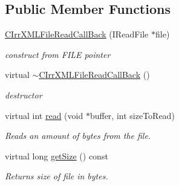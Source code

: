 \subsection*{Public Member Functions}
\begin{DoxyCompactItemize}
\item 
\hypertarget{classirr_1_1io_1_1_c_irr_x_m_l_file_read_call_back_ac7083abde7449c42fef2ebb64e2271d0}{\hyperlink{classirr_1_1io_1_1_c_irr_x_m_l_file_read_call_back_ac7083abde7449c42fef2ebb64e2271d0}{C\-Irr\-X\-M\-L\-File\-Read\-Call\-Back} (I\-Read\-File $\ast$file)}\label{classirr_1_1io_1_1_c_irr_x_m_l_file_read_call_back_ac7083abde7449c42fef2ebb64e2271d0}

\begin{DoxyCompactList}\small\item\em construct from F\-I\-L\-E pointer \end{DoxyCompactList}\item 
\hypertarget{classirr_1_1io_1_1_c_irr_x_m_l_file_read_call_back_a3f792b3c991d2b29fcfc9d48c83b64fb}{virtual \hyperlink{classirr_1_1io_1_1_c_irr_x_m_l_file_read_call_back_a3f792b3c991d2b29fcfc9d48c83b64fb}{$\sim$\-C\-Irr\-X\-M\-L\-File\-Read\-Call\-Back} ()}\label{classirr_1_1io_1_1_c_irr_x_m_l_file_read_call_back_a3f792b3c991d2b29fcfc9d48c83b64fb}

\begin{DoxyCompactList}\small\item\em destructor \end{DoxyCompactList}\item 
\hypertarget{classirr_1_1io_1_1_c_irr_x_m_l_file_read_call_back_a396b791f3c85529e69a111eae2876fe2}{virtual int \hyperlink{classirr_1_1io_1_1_c_irr_x_m_l_file_read_call_back_a396b791f3c85529e69a111eae2876fe2}{read} (void $\ast$buffer, int size\-To\-Read)}\label{classirr_1_1io_1_1_c_irr_x_m_l_file_read_call_back_a396b791f3c85529e69a111eae2876fe2}

\begin{DoxyCompactList}\small\item\em Reads an amount of bytes from the file. \end{DoxyCompactList}\item 
\hypertarget{classirr_1_1io_1_1_c_irr_x_m_l_file_read_call_back_ae91b40f4c538b3e26925509a2697ef4f}{virtual long \hyperlink{classirr_1_1io_1_1_c_irr_x_m_l_file_read_call_back_ae91b40f4c538b3e26925509a2697ef4f}{get\-Size} () const }\label{classirr_1_1io_1_1_c_irr_x_m_l_file_read_call_back_ae91b40f4c538b3e26925509a2697ef4f}

\begin{DoxyCompactList}\small\item\em Returns size of file in bytes. \end{DoxyCompactList}\end{DoxyCompactItemize}


